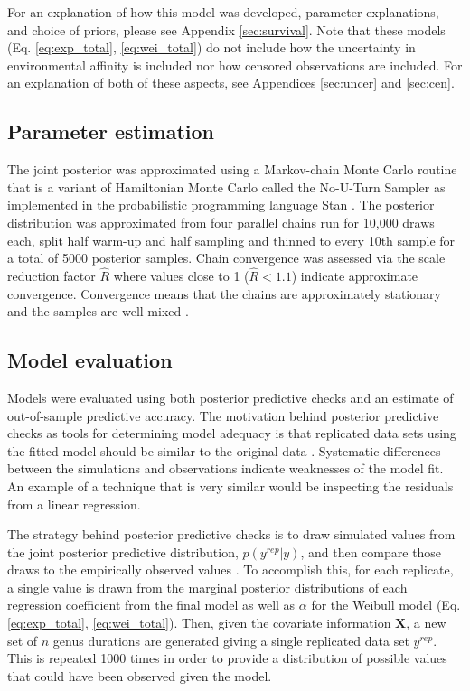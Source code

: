 \documentclass[12pt,letterpaper]{article}
\begin{document}
For an explanation of how this model was developed, parameter explanations, and choice of priors, please see Appendix \ref{sec:survival}. Note that these models (Eq. \ref{eq:exp_total}, \ref{eq:wei_total}) do not include how the uncertainty in environmental affinity is included nor how censored observations are included. For an explanation of both of these aspects, see Appendices \ref{sec:uncer} and \ref{sec:cen}.

\subsection{Parameter estimation}
The  joint posterior was approximated using a Markov-chain Monte Carlo routine that is a variant of Hamiltonian Monte Carlo called the No-U-Turn Sampler \citep{Hoffman2014} as implemented in the probabilistic programming language Stan \citep{2014stan}. The posterior distribution was approximated from four parallel chains run for 10,000 draws each, split half warm-up and half sampling and thinned to every 10th sample for a total of 5000 posterior samples. Chain convergence was assessed via the scale reduction factor \(\hat{R}\) where values close to 1 (\(\hat{R} < 1.1\)) indicate approximate convergence. Convergence means that the chains are approximately stationary and the samples are well mixed \citep{Gelman2013d}.


\subsection{Model evaluation}

Models were evaluated using both posterior predictive checks and an estimate of out-of-sample predictive accuracy. The motivation behind posterior predictive checks as tools for determining model adequacy is that replicated data sets using the fitted model should be similar to the original data \citep{Gelman2013d}. Systematic differences between the simulations and observations indicate weaknesses of the model fit. An example of a technique that is very similar would be inspecting the residuals from a linear regression.

The strategy behind posterior predictive checks is to draw simulated values from the joint posterior predictive distribution, \(p(y^{rep} | y)\), and then compare those draws to the empirically observed values \citep{Gelman2013d}. To accomplish this, for each replicate, a single value is drawn from the marginal posterior distributions of each regression coefficient from the final model as well as \(\alpha\) for the Weibull model (Eq. \ref{eq:exp_total}, \ref{eq:wei_total}). Then, given the covariate information \(\mathbf{X}\), a new set of \(n\) genus durations are generated giving a single replicated data set \(y^{rep}\). This is repeated 1000 times in order to provide a distribution of possible values that could have been observed given the model. 
\end{document}
